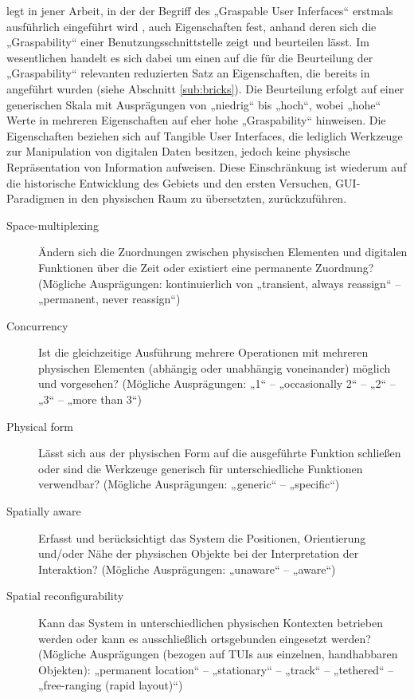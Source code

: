 \citeauthor{Fitzmaurice96} legt in jener Arbeit, in der der Begriff des „Graspable User Inferfaces“ erstmals ausführlich eingeführt wird \citep{Fitzmaurice96}, auch Eigenschaften fest, anhand deren sich die „Graspability“ einer Benutzungsschnittstelle zeigt und beurteilen lässt. Im wesentlichen handelt es sich dabei um einen auf die für die Beurteilung der „Graspability“ relevanten reduzierten Satz an Eigenschaften, die bereits in \citep{Fitzmaurice95} angeführt wurden (siehe Abschnitt \ref{sub:bricks}). Die Beurteilung erfolgt auf einer generischen Skala mit Ausprägungen von „niedrig“ bis „hoch“, wobei „hohe“ Werte in mehreren Eigenschaften auf eher hohe „Graspability“ hinweisen. Die Eigenschaften beziehen sich auf Tangible User Interfaces, die lediglich Werkzeuge zur Manipulation von digitalen Daten besitzen, jedoch keine physische Repräsentation von Information aufweisen. Diese Einschränkung ist wiederum auf die historische Entwicklung des Gebiets und den ersten Versuchen, GUI-Paradigmen in den physischen Raum zu übersetzten, zurückzuführen.

\begin{description}
	\item[Space-multiplexing] Ändern sich die Zuordnungen zwischen physischen Elementen und digitalen Funktionen über die Zeit oder existiert eine permanente Zuordnung? (Mögliche Ausprägungen: kontinuierlich von „transient, always reassign“ -- „permanent, never reassign“)
	\item[Concurrency] Ist die gleichzeitige Ausführung mehrere Operationen mit mehreren physischen Elementen (abhängig oder unabhängig voneinander) möglich und vorgesehen? (Mögliche Ausprägungen: „1“ -- „occasionally 2“ -- „2“ -- „3“ -- „more than 3“)
	\item[Physical form] Lässt sich aus der physischen Form auf die ausgeführte Funktion schließen oder sind die Werkzeuge generisch für unterschiedliche Funktionen verwendbar? (Mögliche Ausprägungen: „generic“ -- „specific“) 
	\item[Spatially aware] Erfasst und berücksichtigt das System die Positionen, Orientierung und/oder Nähe der physischen Objekte bei der Interpretation der Interaktion? (Mögliche Ausprägungen: „unaware“ -- „aware“)
	\item[Spatial reconfigurability] Kann das System in unterschiedlichen physischen Kontexten betrieben werden oder kann es ausschließlich ortsgebunden eingesetzt werden? (Mögliche Ausprägungen (bezogen auf \glspl{TUI} aus einzelnen, handhabbaren Objekten): „permanent location“ -- „stationary“ -- „track“ -- „tethered“ -- „free-ranging (rapid layout)“)
\end{description}

